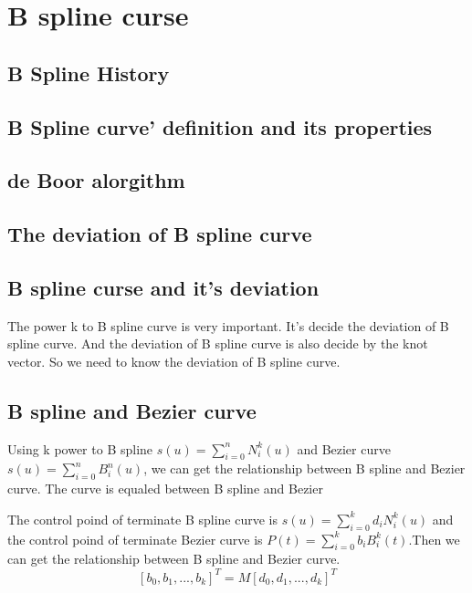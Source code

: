 \chapter{B spline curse}
\section{B Spline History}

\section{B Spline curve' definition and its properties}

\section{de Boor alorgithm}



\section{The deviation of B spline curve}

\section{B spline curse and it's deviation}

The power k to B spline curve is very important. It's decide the deviation of B spline curve. And the deviation of B spline curve is also decide by the knot vector. So we need to know the deviation of B spline curve.\\

\section{B spline and Bezier curve}

Using k power to B spline $s(u)=\sum\limits_{i=0}^{n} N_{i}^{k}(u)$ and Bezier curve $s(u)=\sum\limits_{i=0}^{n} B_{i}^{n}(u)$, we can get the relationship between B spline and Bezier curve. The curve is equaled between B spline and Bezier \\

\begin{definition}[]
	The control poind of terminate B spline curve is $s(u) = \sum_{i=0}^{k}d_i N_{i}^{k}(u)$ and the control poind of terminate Bezier curve is $P(t) = \sum\limits_{i=0}^{k}b_i B_{i}^{k}(t) $.Then we can get the relationship between B spline and Bezier curve.\[
		[b_0,b_1,...,b_k]^T = M[d_0,d_1,...,d_k]^T
	\]
\end{definition}



